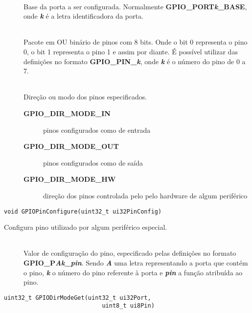 \begin{description}
	\item []\hfill \\
	Base da porta a ser configurada. Normalmente \textbf{GPIO\_PORT\emph{k}\_BASE}, onde \textbf{\emph{k}} é a letra identificadora da porta.
	
	\item []\hfill \\
	Pacote em OU binário de pinos com 8 bits. Onde o bit 0 representa o pino 0, o bit 1 representa o pino 1 e assim por diante. É possível utilizar das definições no formato  \textbf{GPIO\_PIN\_\emph{k}}, onde \textbf{\emph{k}} é o número do pino de 0 a 7.
	
	\item []\hfill \\
	Direção ou modo dos pinos especificados.
	
	\begin{description}
		\item [\textbf{GPIO\_DIR\_MODE\_IN}] pinos configurados como de entrada
		\item [\textbf{GPIO\_DIR\_MODE\_OUT}] pinos configurados como de saída
		\item [\textbf{GPIO\_DIR\_MODE\_HW}] direção dos pinos controlada pelo pelo hardware de algum periférico
	\end{description}
\end{description}

\begin{lstlisting}[style=funcao]
	void GPIOPinConfigure(uint32_t ui32PinConfig)
\end{lstlisting}

Configura pino utilizado por algum periférico especial.

\begin{description}
	\item []\hfill \\
	Valor de configuração do pino, especificado pelas definições no formato \textbf{GPIO\_P\emph{Ak}\_\emph{pin}}. Sendo \textbf{\emph{A}} uma letra representando a porta que contém o pino, \textbf{\emph{k}} o número do pino referente à porta e \textbf{\emph{pin}} a função atribuída ao pino.
\end{description}

\begin{lstlisting}[style=funcao]
	uint32_t GPIODirModeGet(uint32_t ui32Port,
							uint8_t ui8Pin)
\end{lstlisting}

